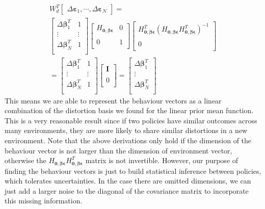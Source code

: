 \begin{equation}
\begin{gathered}
W_{d}^T
\begin{bmatrix}
\Delta \bm{\varepsilon}_1, \cdots , \Delta \bm{\varepsilon}_N
\end{bmatrix}
= \\
\begin{bmatrix}
\Delta \bm{\beta}_1^T & 1\\
\vdots & \vdots \\
\Delta \bm{\beta}_N^T & 1\\
\end{bmatrix}
%
\begin{bmatrix}
H_{\bm{0, \beta \epsilon}} & 0 \\
\\
0 & 1 \\
\end{bmatrix}
\begin{bmatrix}
H_{\bm{0, \beta \epsilon}}^T
(H_{\bm{0, \beta \epsilon}}H_{\bm{0, \beta \epsilon}}^T)^{-1} \\
\\
0 \\
\end{bmatrix}
\\ 
= 
\begin{bmatrix}
\Delta \bm{\beta}_1^T & 1\\
\vdots & \vdots \\
\Delta \bm{\beta}_N^T & 1\\
\end{bmatrix}
%
\begin{bmatrix}
\mathbf{I} \\
\\
0 \\
\end{bmatrix} 
= 
\begin{bmatrix}
\Delta \bm{\beta}_1^T \\
\vdots \\
\Delta \bm{\beta}_N^T \\
\end{bmatrix}
\end{gathered}
\label{beta}
\end{equation}
This means we are able to represent the behaviour vectors as a linear combination of the distortion basis we found for the linear prior mean function.
This is a very reasonable result since if two policies have similar outcomes across many environments, they are more likely to share similar distortions in a new environment.
Note that the above derivations only hold if the dimension of the behaviour vector is not larger than the dimension of environment vector, otherwise the $H_{\bm{0, \beta \epsilon}}H_{\bm{0, \beta \epsilon}}^T$ matrix is not invertible.
However, our purpose of finding the behaviour vectors is just to build statistical inference between policies, which tolerates uncertainties.
In the case there are omitted dimensions, we can just add a larger noise to the diagonal of the covariance matrix to incorporate this missing information.


